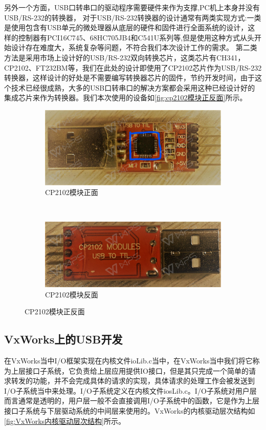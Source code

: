	
	另外一个方面，USB口转串口的驱动程序需要硬件来作为支撑,PC机上本身并没有USB/RS-232的转换器，
	对于USB/RS-232转换器的设计通常有两类实现方式:一类是使用包含有USB单元的微处理器从底层的硬件和固件进行全面系统的设计，这样的控制器有PCI16C745、68HC705JB4和C541U系列等\cite{USB与RS232接口转换器的设计},但是使用这种方式从头开始设计存在难度大，系统复杂等问题，不符合我们本次设计工作的需求。
	第二类方法是采用市场上设计好的USB/RS-232双向转换芯片，这类芯片有CH341，CP2102、FT232BM等，我们在此处的设计即使用了CP2102芯片作为USB/RS-232转换器，这样设计的好处是不需要编写转换器芯片的固件，节约开发时间，由于这个技术已经很成熟，大多的USB口转串口的解决方案都会采用这种已经设计好的集成芯片来作为转换器。我们本次使用的设备如\autoref{fig:cp2102模块正反面}所示。
\begin{figure}[h]
\centering
  \begin{subfigure}[b]{0.4\textwidth}
  \includegraphics[width=\textwidth]{./graphics/cp2102Front.pdf}
  \caption{CP2102模块正面}\label{fig:cp2102Front}
  \end{subfigure}
  ~
  \begin{subfigure}[b]{0.4\textwidth}
  \includegraphics[width=\textwidth]{./graphics/cp2102Rear.pdf}
  \caption{CP2102模块反面}\label{fig:cp2102Rear}
  \end{subfigure}
\caption{CP2102模块正反面}\label{fig:cp2102模块正反面}
\end{figure}



\subsection{VxWorks上的USB开发}
	在VxWorks当中I/O框架实现在内核文件ioLib.c当中，在VxWorks当中我们将它称为上层接口子系统，它负责给上层应用提供IO接口，但是其只完成一个简单的请求转发的功能，并不会完成具体的请求的实现，具体请求的处理工作会被发送到I/O子系统当中来处理。I/O子系统定义在内核文件iosLib.c。I/O子系统对用户层而言通常是透明的，用户层一般不会直接调用I/O子系统中的函数，它是作为上层接口子系统与下层驱动系统的中间层来使用的。VxWorks的内核驱动层次结构如\autoref{fig:VxWorks内核驱动层次结构}所示。	


